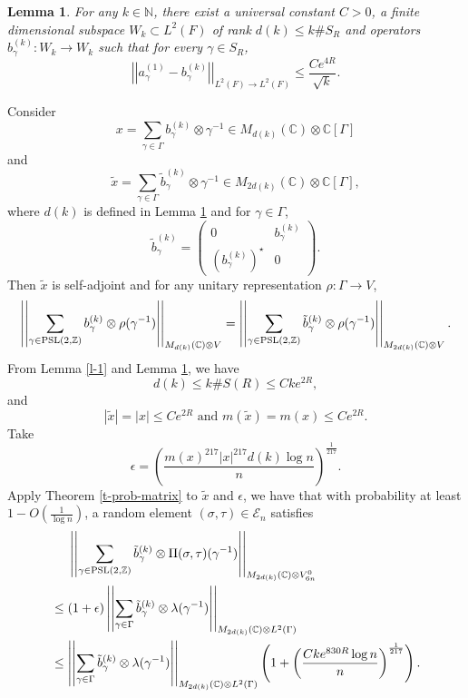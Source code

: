 \documentclass{amsart}
\theoremstyle{plain}
\newtheorem{lemma}[theorem]{Lemma}
\theoremstyle{definition}
\theoremstyle{remark}
\begin{document}
\begin{lemma}\label{l-2}
    For any $k\in\mathbb{N}$, there exist a universal constant $C>0$, a finite dimensional subspace $W_k\subset L^2(F)$ of rank $d(k)\leq k\#S_R$ and operators $b_\gamma^{(k)}:W_k\to W_k$ such that for every $\gamma\in S_R$,
    $$\left|\left|a_\gamma^{(1)}-b_\gamma^{(k)}\right|\right|_{L^2(F)\to L^2(F)}\leq \frac{Ce^{4R}}{\sqrt{k}}.$$
\end{lemma}
Consider
 $$x=\sum\limits_{\gamma\in\Gamma}b_\gamma^{(k)}\otimes \gamma^{-1}\in M_{d(k)}(\mathbb{C})\otimes \mathbb{C}[\Gamma]$$ 
 and
 $$\tilde{x}=\sum\limits_{\gamma\in\Gamma}\tilde{b}_\gamma^{(k)}\otimes \gamma^{-1}\in M_{2d(k)}(\mathbb{C})\otimes \mathbb{C}[\Gamma],$$
where $d(k)$ is defined in Lemma \ref{l-2} and for $\gamma\in\Gamma$,
$$\tilde{b}_\gamma^{(k)}=\begin{pmatrix}
    0 & b_\gamma^{(k)}\\ \left(b_\gamma^{(k)}\right)^\star &0
\end{pmatrix}.$$
 Then $\tilde{x}$ is self-adjoint and for any unitary representation $\rho:\Gamma\to V$,
 \begin{align}\label{e-norm-rep}
 \left|\left|\sum\limits_{\gamma\in\textnormal{PSL}(2,\mathbb{Z})}b_\gamma^{(k)}\otimes\rho(\gamma^{-1})\right|\right|_{M_{d(k)}(\mathbb{C})\otimes V}=\left|\left|\sum\limits_{\gamma\in\textnormal{PSL}(2,\mathbb{Z})}\tilde{b}_\gamma^{(k)}\otimes\rho(\gamma^{-1})\right|\right|_{M_{2d(k)}(\mathbb{C})\otimes V}.
 \end{align}
 From  Lemma \ref{l-1} and Lemma \ref{l-2}, we have 
$$d(k)\leq k\#S(R)\leq Cke^{2R},$$
and
$$|\tilde{x}|=|x|\leq  Ce^{2R}\text{ and }m(\tilde{x})=m(x)\leq Ce^{2R}.$$
Take $$\epsilon=\left(\frac{m(x)^{217}|x|^{217}d(k)\log n}{n}\right)^{\frac{1}{217}}.$$ 
Apply Theorem \ref{t-prob-matrix} to $\tilde{x}$ and $\epsilon$, we have that with probability at least $1-O\left(\frac{1}{\log n}\right)$, a random element $(\sigma,\tau)\in\mathcal{E}_n$ satisfies 
\begin{align*}
&\ \ \ \ \left|\left|\sum\limits_{\gamma\in\textnormal{PSL}(2,\mathbb{Z})}\tilde{b}_\gamma^{(k)}\otimes\Pi(\sigma,\tau)(\gamma^{-1})\right|\right|_{M_{2d(k)}(\mathbb{C})\otimes V_{6n}^0}\\
&\leq (1+\epsilon)\left|\left|\sum\limits_{\gamma\in\Gamma}\tilde{b}_\gamma^{(k)}\otimes\lambda(\gamma^{-1})\right|\right|_{M_{2d(k)}(\mathbb{C})\otimes L^2(\Gamma)}\\
&\leq \left|\left|\sum\limits_{\gamma\in\Gamma}\tilde{b}_\gamma^{(k)}\otimes\lambda(\gamma^{-1})\right|\right|_{M_{2d(k)}(\mathbb{C})\otimes L^2(\Gamma)}\left(1+\left(\frac{Cke^{830 R}\log n}{n}\right)^{\frac{1}{217}}\right).
\end{align*}
\end{document}
